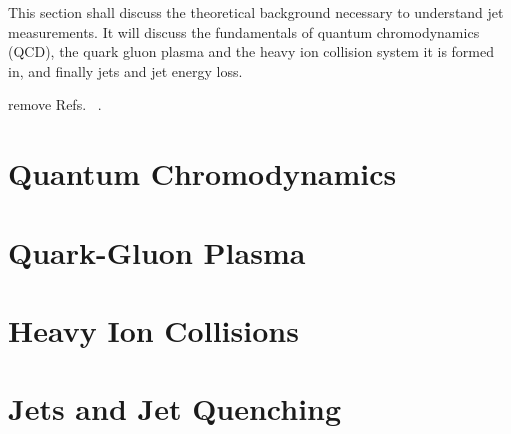 This section shall discuss the theoretical background necessary to understand jet measurements.
It will discuss the fundamentals of quantum chromodynamics (QCD), the quark gluon plasma and the heavy ion collision system it is formed in, and finally jets and jet energy loss.

remove Refs.~\cite{Roland:2014jsa} .
\section{Quantum Chromodynamics}
\label{sec:qcd}


\section{Quark-Gluon Plasma}
\label{sec:qgp}


\section{Heavy Ion Collisions}
\label{sec:HICollisions}


\section{Jets and Jet Quenching}
\label{sec:jets}


